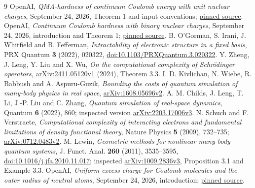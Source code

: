 \documentclass[11pt]{article}
\theoremstyle{remark}\newtheorem{remark}[theorem]{Remark}
\numberwithin{equation}{section}
\begin{document}
\begin{thebibliography}{9}
 OpenAI, \emph{QMA-hardness of continuum Coulomb energy with unit
nuclear charges}, September 24, 2026, Theorem 1 and input conventions;
\href{https://github.com/openai/math/tree/fd4aeeb2ee4fc729c18d98444fed42fd0529eeeb/preprints/QMA-hardness-of-continuum-Coulomb-energy-with-unit-nuclear-charges-September-24-2026}{pinned source}.
 OpenAI, \emph{Continuum Coulomb hardness with binary nuclear
charges}, September 24, 2026, introduction and Theorem 1;
\href{https://github.com/openai/math/tree/fd4aeeb2ee4fc729c18d98444fed42fd0529eeeb/preprints/Continuum-Coulomb-hardness-with-binary-nuclear-charges-September-24-2026}{pinned source}.
 B. O'Gorman, S. Irani, J. Whitfield and B. Fefferman,
\emph{Intractability of electronic structure in a fixed basis},
PRX Quantum \textbf{3} (2022), 020322,
\href{https://doi.org/10.1103/PRXQuantum.3.020322}{doi:10.1103/PRXQuantum.3.020322}.
 Y. Zheng, J. Leng, Y. Liu and X. Wu,
\emph{On the computational complexity of Schr\"odinger operators},
\href{https://arxiv.org/abs/2411.05120v1}{arXiv:2411.05120v1} (2024), Theorem 3.3.
 I. D. Kivlichan, N. Wiebe, R. Babbush and A. Aspuru-Guzik,
\emph{Bounding the costs of quantum simulation of many-body physics in real
space}, \href{https://arxiv.org/abs/1608.05696v2}{arXiv:1608.05696v2}.
 A. M. Childs, J. Leng, T. Li, J.-P. Liu and C. Zhang,
\emph{Quantum simulation of real-space dynamics}, Quantum \textbf{6} (2022),
860; inspected version \href{https://arxiv.org/abs/2203.17006v3}{arXiv:2203.17006v3}.
 N. Schuch and F. Verstraete, \emph{Computational complexity of
interacting electrons and fundamental limitations of density functional
theory}, Nature Physics \textbf{5} (2009), 732--735;
\href{https://arxiv.org/abs/0712.0483v2}{arXiv:0712.0483v2}.
 M. Lewin, \emph{Geometric methods for nonlinear many-body
quantum systems}, J. Funct. Anal. \textbf{260} (2011), 3535--3595,
\href{https://doi.org/10.1016/j.jfa.2010.11.017}{doi:10.1016/j.jfa.2010.11.017};
inspected \href{https://arxiv.org/abs/1009.2836v3}{arXiv:1009.2836v3},
Proposition 3.1 and Example 3.3.
 OpenAI, \emph{Uniform excess charge for Coulomb molecules
and the outer radius of neutral atoms}, September 24, 2026, introduction;
\href{https://github.com/openai/math/tree/fd4aeeb2ee4fc729c18d98444fed42fd0529eeeb/preprints/Uniform-excess-charge-for-Coulomb-molecules-and-the-outer-radius-of-neutral-atoms-September-24-2026}{pinned source}.
\end{thebibliography}
\end{document}

